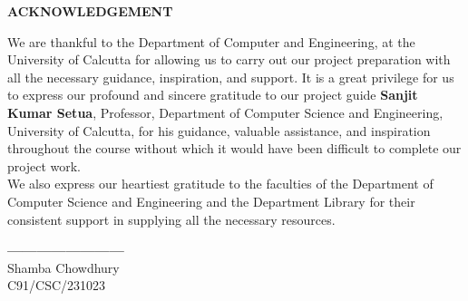 \begin{center}
    {\large {\bf ACKNOWLEDGEMENT}}
\end{center}

We are thankful to the Department of Computer and Engineering, at the University of Calcutta for allowing us to carry out our project preparation with all the necessary guidance, inspiration, and support. It is a great privilege for us to express our profound and sincere gratitude to our project guide  \textbf{Sanjit Kumar Setua}, Professor, Department of Computer Science and Engineering, University of Calcutta, for his guidance, valuable assistance, and inspiration throughout the course without which it would have been difficult to complete our project work. \\
We also express our heartiest gratitude to the faculties of the Department of Computer Science and Engineering and the Department Library for their consistent support in supplying all the necessary resources. \\

\vspace{10em}

\textbf{------------------------} \\
\hspace*{.2in} Shamba Chowdhury \\
\hspace*{.22in}  C91/CSC/231023